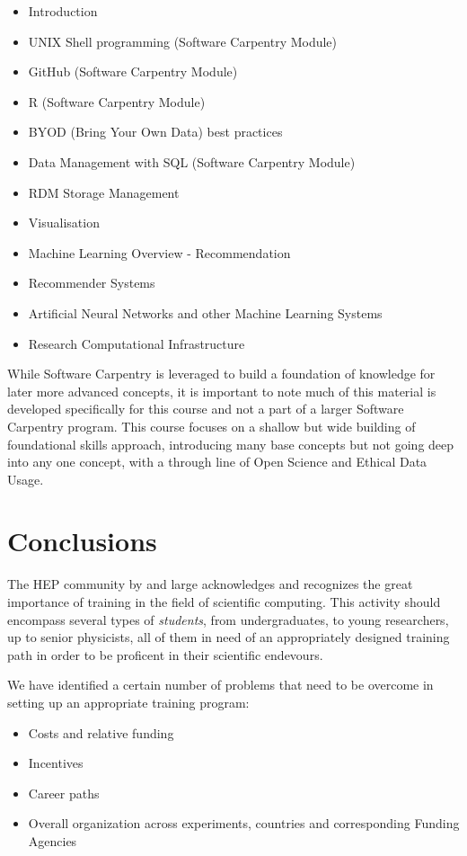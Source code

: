 \begin{itemize}
\item Introduction
\item UNIX Shell programming (Software Carpentry Module)
\item GitHub (Software Carpentry Module)
\item R (Software Carpentry Module)
\item BYOD (Bring Your Own Data) best practices
\item Data Management with SQL  (Software Carpentry Module)
\item RDM Storage Management
\item Visualisation
\item Machine Learning Overview - Recommendation
\item Recommender Systems
\item Artificial Neural Networks and other Machine Learning Systems 
\item Research Computational Infrastructure 
\end{itemize}

While Software Carpentry is leveraged to build a foundation of knowledge for later more advanced concepts, it is important to note much of this material is developed specifically for this course and not a part of a larger Software Carpentry program. This course focuses on a shallow but wide building of foundational skills approach, introducing many base concepts but not going deep into any one concept, with a through line of Open Science and Ethical Data Usage. 

\section{Conclusions}

The HEP community by and large acknowledges and recognizes the great importance of training in the field of scientific computing. This activity should encompass several types of {\it students}, from undergraduates, to young researchers, up to senior physicists, all of them in need of an appropriately designed training path in order to be proficent in their scientific endevours.

We have identified a certain number of problems that need to be overcome in setting up an appropriate training program: 
\begin{itemize}
    \item Costs and relative funding
    \item Incentives
    \item Career paths
    \item Overall organization across experiments, countries and corresponding Funding Agencies
\end{itemize}

